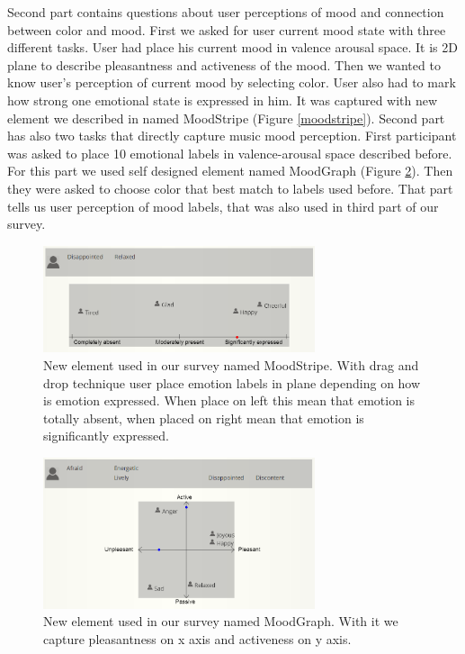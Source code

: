 \documentclass[a4paper]{article}
\begin{document}
Second part contains questions about user perceptions of mood and connection between color and mood. First we asked for user current mood state with three different tasks. User had place his current mood in valence arousal space. It is 2D plane to describe pleasantness and activeness of the mood. Then we wanted to know user's perception of current mood by selecting color. User also had to mark how strong one emotional state is expressed in him. It was captured with new element we described in \cite{pesek2014gathering} named MoodStripe (Figure \ref{moodstripe}). Second part has also two tasks that directly capture music mood perception. First participant was asked to place 10 emotional labels in valence-arousal space described before. For this part we used self designed element named MoodGraph (Figure \ref{moodgraph}). Then they were asked to choose color that best match to labels used before. That part tells us user perception of mood labels, that was also used in third part of our survey. 

\begin{figure}[ht]
\centering
\includegraphics[width=80mm]{moodstripe.png}
\caption{New element used in our survey named MoodStripe. With drag and drop technique user place emotion labels in plane depending on how is emotion expressed. When place on left this mean that emotion is totally absent, when placed on right mean that emotion is significantly  expressed. }
\label{moodgraph}
\end{figure}

\begin{figure}[ht]
\centering
\includegraphics[width=80mm]{moodgraph.png}
\caption{New element used in our survey named MoodGraph. With it we capture pleasantness on x axis and activeness on y axis. }
\label{moodgraph}
\end{figure}
\end{document}
